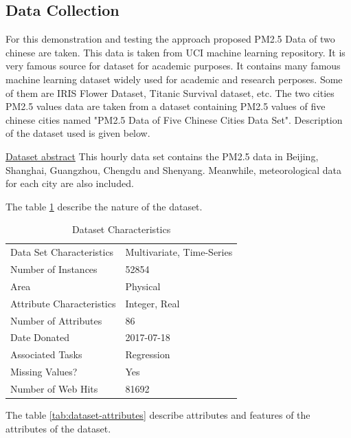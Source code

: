 \subsection{Data Collection}

For this demonstration and testing the approach proposed 
PM2.5 Data of two chinese are taken. This data is taken from UCI machine learning repository. It is very famous source for dataset for academic purposes. It contains many famous machine learning dataset widely used for academic and research perposes. Some of them are IRIS Flower Dataset, Titanic Survival dataset, etc. The two cities PM2.5 values data are taken from a dataset containing PM2.5 values of five chinese cities named "PM2.5 Data of Five Chinese Cities Data Set". Description of the dataset used is given below.

\underline{Dataset abstract} This hourly data set contains the PM2.5 data in Beijing, Shanghai, Guangzhou, Chengdu and Shenyang. Meanwhile, meteorological data for each city are also included.

The table \ref{tab:dataset-characteristic} describe the nature of the dataset.

\begin{table}[ht]
\centering
\begin{tabular}[widht=\textwidth]{|l|l|}
\hline
Data Set Characteristics &  Multivariate, Time-Series \\
Number of Instances & 52854 \\
Area & Physical \\
Attribute Characteristics & Integer, Real \\
Number of Attributes & 86 \\
Date Donated & 2017-07-18 \\
Associated Tasks & Regression \\
Missing Values? & Yes \\
Number of Web Hits & 81692 \\
\hline

\end{tabular}
\caption{Dataset Characteristics}
\label{tab:dataset-characteristic}
\end{table}

The table \ref{tab:dataset-attributes} describe attributes and features of the attributes of the dataset.


